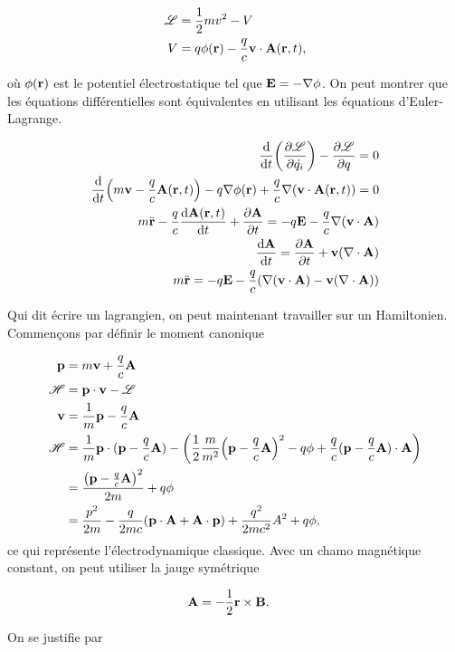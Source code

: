\begin{align}
    \mathscr{L}&=\frac12mv^2-V\\
    V&=q\phi(\vb{r})-\frac qc\vb{v}\cdot\vb{A}(\vb{r},t),
\end{align}

où $\phi(\vb{r})$ est le potentiel électrostatique tel que $\vb{E}=-\nabla\phi$.
On peut montrer que les équations différentielles sont équivalentes en  utilisant
les équations d'Euler-Lagrange.

\begin{align}
    \dv{t} \qty(\pdv{\mathscr{L}}{\dot{q_i}})-\pdv{\mathscr{L}}{q}=0\\
    \dv{t} \qty(m\vb{v}-\frac qc\vb{A}(\vb{r},t))-q\nabla\phi(\vb{r})+\frac qc\nabla\qty(
    \vb{v}\cdot\vb{A}(\vb{r},t))=0\\
    m\ddot{\vb{r}}-\frac qc\dv{\vb{A}(\vb{r},t)}{t}+\pdv{\vb{A}}{t}=-q\vb{E}-\frac qc\nabla(\vb{v}\cdot
    \vb{A})\\
\dv{\vb{A}}{t}=\pdv{\vb{A}}{t}+\vb{v}(\nabla\cdot\vb{A})\\
m\ddot{\vb{r}}=-q\vb{E}-\frac qc\qty(\nabla(\vb{v}\cdot\vb{A})-\vb{v}(\nabla\cdot\vb{A}))
\end{align}

Qui dit écrire un lagrangien, on peut maintenant travailler sur un Hamiltonien.
Commençons par définir le moment canonique

\begin{align}
    \vb{p}&=m\vb{v}+\frac qc\vb{A}\\
    \mathscr{H}&=\vb{p}\cdot\vb{v}-\mathscr{L}\\
    \vb{v}&=\frac1m\vb{p}-\frac qc\vb{A}\\
    \mathscr{H}&=\frac1m\vb{p}\cdot(\vb{p}-\frac qc\vb{A})-\qty(\frac12\frac m{m^2}
    \qty(\vb{p}-\frac qc\vb{A})^2-q\phi+\frac qc(\vb{p}-\frac qc\vb{A})\cdot\vb{A})\\
               &=\frac{\qty(\vb{p}-\frac qc\vb{A})^2}{2m}+q\phi\\
               &=\frac{p^2}{2m}-\frac q{2mc}(\vb{p}\cdot\vb{A}+\vb{A}\cdot\vb{p})
               +\frac{q^2}{2mc^2}A^2+q\phi,
\end{align}
ce qui représente l'électrodynamique classique. Avec un chamo magnétique constant,
on peut utiliser la jauge symétrique

\begin{align}
    \vb{A}&=-\frac12\vb{r}\times\vb{B}.
\end{align}

On se justifie par

